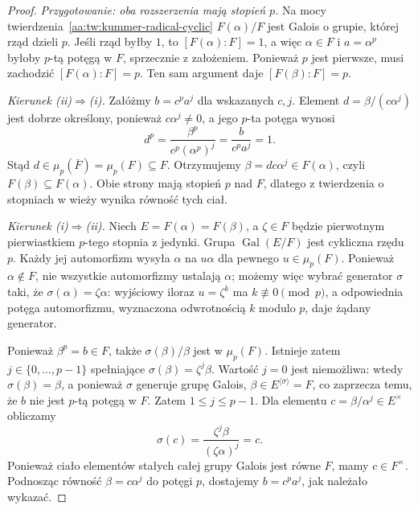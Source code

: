 \begin{proof}
\emph{Przygotowanie: oba rozszerzenia mają stopień $p$.}
Na mocy twierdzenia~\ref{aa:tw:kummer-radical-cyclic}
$F(\alpha)/F$ jest Galois o grupie, której rząd dzieli $p$.
Jeśli rząd byłby $1$, to $[F(\alpha):F]=1$,
a więc $\alpha\in F$ i $a=\alpha^p$ byłoby $p$-tą
potęgą w $F$, sprzecznie z założeniem. Ponieważ $p$ jest
pierwsze, musi zachodzić $[F(\alpha):F]=p$.
Ten sam argument daje $[F(\beta):F]=p$.

\emph{Kierunek (ii)$\Rightarrow$(i).}
Załóżmy $b=c^p a^j$ dla wskazanych $c,j$.
Element $d=\beta/(c\alpha^j)$ jest dobrze określony,
ponieważ $c\alpha^j\neq0$, a jego $p$-ta potęga wynosi
\[
d^p=\frac{\beta^p}{c^p(\alpha^p)^j}
 =\frac{b}{c^pa^j}=1.
\]
Stąd $d\in\mu_p(\overline F)=\mu_p(F)\subseteq F$.
Otrzymujemy $\beta=dc\alpha^j\in F(\alpha)$,
czyli $F(\beta)\subseteq F(\alpha)$.
Obie strony mają stopień $p$ nad $F$, dlatego z twierdzenia
o stopniach w wieży wynika równość tych ciał.

\emph{Kierunek (i)$\Rightarrow$(ii).}
Niech $E=F(\alpha)=F(\beta)$, a $\zeta\in F$ będzie
pierwotnym pierwiastkiem $p$-tego stopnia z jedynki.
Grupa $\operatorname{Gal}(E/F)$ jest cykliczna rzędu $p$.
Każdy jej automorfizm wysyła $\alpha$ na $u\alpha$
dla pewnego $u\in\mu_p(F)$. Ponieważ $\alpha\notin F$,
nie wszystkie automorfizmy ustalają $\alpha$;
możemy więc wybrać generator $\sigma$ taki, że
$\sigma(\alpha)=\zeta\alpha$:
wyjściowy iloraz $u=\zeta^k$ ma $k\not\equiv0\pmod p$,
a odpowiednia potęga automorfizmu, wyznaczona odwrotnością
$k$ modulo $p$, daje żądany generator.

Ponieważ $\beta^p=b\in F$, także
$\sigma(\beta)/\beta$ jest w $\mu_p(F)$.
Istnieje zatem $j\in\{0,\ldots,p-1\}$ spełniające
$\sigma(\beta)=\zeta^j\beta$.
Wartość $j=0$ jest niemożliwa: wtedy $\sigma(\beta)=\beta$,
a ponieważ $\sigma$ generuje grupę Galois,
$\beta\in E^{\langle\sigma\rangle}=F$,
co zaprzecza temu, że $b$ nie jest $p$-tą potęgą w $F$.
Zatem $1\leq j\leq p-1$.
Dla elementu $c=\beta/\alpha^j\in E^\times$ obliczamy
\[
\sigma(c)=\frac{\zeta^j\beta}{(\zeta\alpha)^j}
=c.
\]
Ponieważ ciało elementów stałych całej grupy Galois jest równe $F$,
mamy $c\in F^\times$. Podnosząc równość
$\beta=c\alpha^j$ do potęgi $p$, dostajemy
$b=c^pa^j$, jak należało wykazać.
\end{proof}

